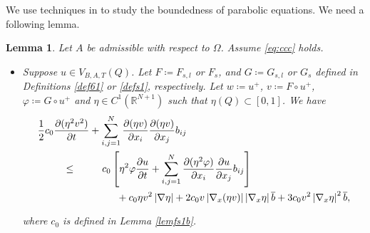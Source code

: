 \documentclass[11pt, a4paper]{article}
\newtheorem{lemma}[theorem]{Lemma}
\numberwithin{equation}{section}
\newcommand{\coex}[2][\hphantom{longexplanation}]{%
  \underset{{#1}}{\overset{\hphantom{longexplanation}}{#2}}
}
\newcommand{\RR}{{\mathbb R}}
\newcommand{\abs}[1]{\left\lvert #1\right\rvert}
\begin{document}
We use techniques in \cite{ducGlobalHolderContinuity,moserHarnackInequalityParabolic1964} to study  the boundedness of parabolic equations. We need a following lemma.
\begin{lemma}
  Let $A$ be admissible with respect to $\Omega$. Assume \eqref{eq:ccc}
  holds.
  \begin{itemize}
  \item[$(i)$] Suppose $u\in V_{B,A,T}(Q)$.  Let $F\coloneqq F_{s,l}$
    or $F_{s}$, and $G\coloneqq G_{s,l}$ or $G_{s}$ defined in Definitions
    \ref{def61} or \ref{defs1}, respectively. Let $w\coloneqq u^{+}$,
    $v\coloneqq F\circ u^{+}$, $\varphi\coloneqq G\circ u^{+}$ and
    $\eta\in C^{1} \left(\RR^{N+1} \right)$ such that
    $\eta(Q)\subset [0,1]$. We have
  \begin{align}
    \begin{split}
      &\frac{1}{2}c_{0}\frac{\partial (\eta^{2}v^{2})}{\partial
      t}+\sum_{i,j=1}^{N}\frac{\partial (\eta v)}{\partial
        x_{i}}\frac{\partial(\eta v)}{\partial x_{j}}b_{ij}\\
      &\coex{\le} c_{0} \left[
    \eta^{2}\varphi\frac{\partial u}{\partial
      t}+\sum_{i,j=1}^{N}\frac{\partial (\eta^{2}\varphi)}{\partial
      x_{i}}\frac{\partial u}{\partial x_{j}}b_{ij} \right]\\
    &\coex{~} \qquad + c_{0}\eta v^{2}\abs{\nabla \eta}+2c_{0} v
      \abs{\nabla_{x}(\eta v)} \abs{\nabla_x \eta}\overline{b}+ 3c_{0}v^{2}\abs{\nabla_x \eta}^{2}\overline{b},
    \end{split}
    \label{p1031}
  \end{align}
where  $c_{0}$ is defined in Lemma \ref{lemfs1b}.%
  


\end{itemize}
\end{lemma}
\end{document}
